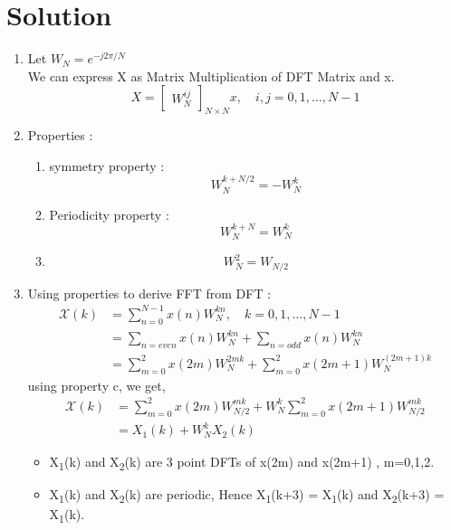 \documentclass[journal,12pt,twocolumn]{IEEEtran}
\renewcommand\thesection{\arabic{section}}
\begin{document}
\section{Solution}
\begin{enumerate}[label=\thesection.\arabic*.,ref=\thesection.\theenumi]

\item
Let $W_{N} = e^{-j2\pi/N} $ \\
We can express X as Matrix Multiplication of DFT Matrix and x.
\begin{equation}
X = 
\begin{bmatrix}
W^{ij}_{N} 
\end{bmatrix}_{N \times N}
x, \quad i,j = 0,1, \ldots, N-1
\end{equation}

\item
Properties :
\begin{enumerate}
    \item symmetry property : \[ W^{k+N/2}_{N} = - W^{k}_{N} \] 
    \item Periodicity property :  \[ W^{k+N}_{N} =  W^{k}_{N} \] 
    \item \[ W^{2}_{N} =  W_{N/2} \] 

\end{enumerate}

\item 
Using properties to derive FFT from DFT :
    \begin{align}
       \mathcal X(k) &=  \sum_{n=0}^{N-1} x(n)W^{kn}_{N}, \quad k=0,1, \ldots, N-1 \\
       &= \sum_{n=even} x(n)W^{kn}_{N} + \sum_{n=odd} x(n)W^{kn}_{N} \\
       &= \sum_{m=0}^{2} x(2m)W^{2mk}_{N} + \sum_{m=0}^{2} x(2m+1)W^{(2m+1)k}_{N} 
    \end{align}
using property c, we get,
    \begin{align}
        \mathcal X(k) &= \sum_{m=0}^{2} x(2m)W^{mk}_{N/2} + W^{k}_{N} \sum_{m=0}^{2} x(2m+1)W^{mk}_{N/2} \\
        &= X_{1}(k) + W^{k}_{N}X_{2}(k)
    \end{align}
    
\begin{itemize}
    \item X\textsubscript{1}(k) and X\textsubscript{2}(k) are 3 point DFTs of x(2m) and x(2m+1) , m=0,1,2.
    \item X\textsubscript{1}(k) and X\textsubscript{2}(k) are periodic, Hence X\textsubscript{1}(k+3) = X\textsubscript{1}(k) and X\textsubscript{2}(k+3) = X\textsubscript{1}(k).
\end{itemize}
\\


\end{enumerate}
\end{document}
